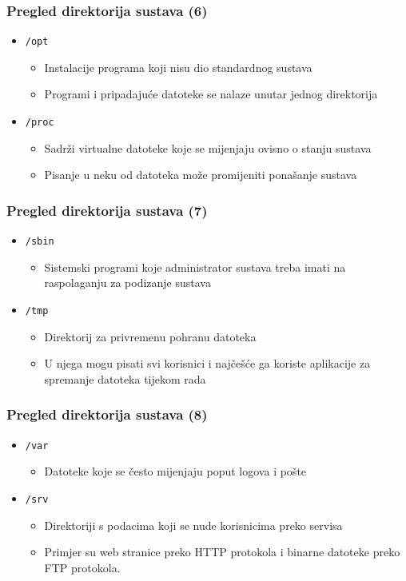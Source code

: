\documentclass{beamer}
\begin{document}
\begin{frame}[t]
\frametitle{Pregled direktorija sustava (6)}
\begin{itemize}
  \item \texttt{/opt}
  \begin{itemize}
    \item Instalacije programa koji nisu dio standardnog sustava
    \item Programi i pripadajuće datoteke se nalaze unutar jednog
          direktorija
  \end{itemize}
  \item \texttt{/proc}
  \begin{itemize}
    \item Sadrži virtualne datoteke koje se mijenjaju ovisno o stanju
          sustava
    \item Pisanje u neku od datoteka može promijeniti ponašanje sustava
  \end{itemize}
\end{itemize}
\end{frame}


\begin{frame}[t]
\frametitle{Pregled direktorija sustava (7)}
\begin{itemize}
  \item \texttt{/sbin}
  \begin{itemize}
    \item Sistemski programi koje administrator sustava treba imati na
          raspolaganju za podizanje sustava
  \end{itemize}
  \item \texttt{/tmp}
  \begin{itemize}
    \item Direktorij za privremenu pohranu datoteka
    \item U njega mogu pisati svi korisnici i najčešće ga koriste
          aplikacije za spremanje datoteka tijekom rada
  \end{itemize}
\end{itemize}
\end{frame}

\begin{frame}[t]
\frametitle{Pregled direktorija sustava (8)}
\begin{itemize}
  \item \texttt{/var}
  \begin{itemize}
    \item Datoteke koje se često mijenjaju poput logova i pošte
  \end{itemize}
  \item \texttt{/srv}
  \begin{itemize}
    \item Direktoriji s podacima koji se nude korisnicima preko servisa
    \item Primjer su web stranice preko HTTP protokola i binarne datoteke
          preko FTP protokola.
  \end{itemize}
\end{itemize}
\end{frame}
\end{document}

